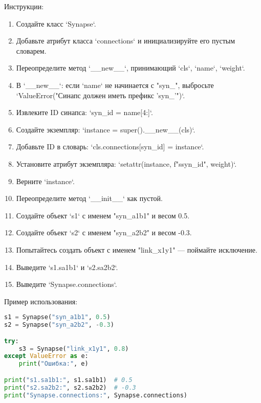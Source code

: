 \begin{enumerate}
Инструкции:
\begin{enumerate}
    \item Создайте класс `Synapse`.
    \item Добавьте атрибут класса `connections` и инициализируйте его пустым словарем.
    \item Переопределите метод `\_\_new\_\_`, принимающий `cls`, `name`, `weight`.
    \item В `\_\_new\_\_`: если `name` не начинается с "syn\_", выбросьте `ValueError("Синапс должен иметь префикс 'syn\_'")`.
    \item Извлеките ID синапса: `syn\_id = name[4:]`.
    \item Создайте экземпляр: `instance = super().\_\_new\_\_(cls)`.
    \item Добавьте ID в словарь: `cls.connections[syn\_id] = instance`.
    \item Установите атрибут экземпляра: `setattr(instance, f"s{syn\_id}", weight)`.
    \item Верните `instance`.
    \item Переопределите метод `\_\_init\_\_` как пустой.
    \item Создайте объект `s1` с именем "syn\_a1b1" и весом 0.5.
    \item Создайте объект `s2` с именем "syn\_a2b2" и весом -0.3.
    \item Попытайтесь создать объект с именем "link\_x1y1" — поймайте исключение.
    \item Выведите `s1.sa1b1` и `s2.sa2b2`.
    \item Выведите `Synapse.connections`.
\end{enumerate}

Пример использования:
\begin{lstlisting}[language=Python]
s1 = Synapse("syn_a1b1", 0.5)
s2 = Synapse("syn_a2b2", -0.3)

try:
    s3 = Synapse("link_x1y1", 0.8)
except ValueError as e:
    print("Ошибка:", e)

print("s1.sa1b1:", s1.sa1b1)  # 0.5
print("s2.sa2b2:", s2.sa2b2)  # -0.3
print("Synapse.connections:", Synapse.connections)
\end{lstlisting}


\end{enumerate}

